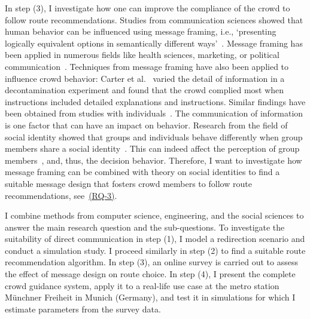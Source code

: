 In step (3), I investigate how one can improve the compliance of the crowd to follow route recommendations. Studies from communication sciences showed that human behavior can be influenced using message framing, i.e., `presenting logically equivalent options in semantically different ways'~\cite{krishnamurthy-2001-life}. Message framing has been applied in numerous fields like health sciences, marketing, or political communication~\cite{gallagher-2012-life}.  
Techniques from message framing have also been applied to influence crowd behavior: Carter et al.~\cite{carter-2014-life,carter-2015-life} varied the detail of information in a decontamination experiment and found that the crowd complied most when instructions included detailed explanations and instructions. Similar findings have been obtained from studies with individuals~\cite{tormala-2007-life, osman-2018-life}. The communication of information is one factor that can have an impact on behavior. Research from the field of social identity showed that groups and individuals behave differently when group members share a social identity~\cite{reicher-2016-life,carter-2015-life,sivers-2014b-cdyn}.
This can indeed affect the perception of group members~\cite{novelli-2013-life}, and, thus, the decision behavior. Therefore, I want to investigate how message framing can be combined with theory on social identities to find a suitable message design that fosters crowd members to follow route recommendations, see~\hyperref[reserachquestions]{(RQ-3)}.  




I combine methods from computer science, engineering, and the social sciences to answer the main research question and the sub-questions. To investigate the suitability of direct communication in step (1), I model a redirection scenario and conduct a simulation study. I proceed similarly in step (2) to find a suitable route recommendation algorithm. In step (3), an online survey is carried out to assess the effect of message design on route choice. In step (4), I present the complete crowd guidance system, apply it to a real-life use case at the metro station Münchner Freiheit in Munich (Germany), and test it in simulations for which I estimate parameters from the survey data.


\vspace{0.5cm}


